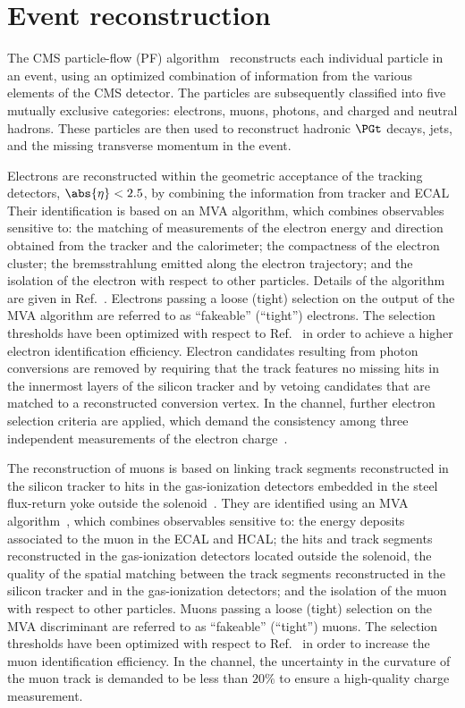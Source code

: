 \section{Event reconstruction}
\label{sec:eventReconstruction}

The CMS particle-flow (PF) algorithm~\cite{Sirunyan:2017ulk} reconstructs each individual particle in an event,
using an optimized combination of information from the various elements of the CMS detector.
The particles are subsequently classified into five mutually exclusive categories: 
electrons, muons, photons, and charged and neutral hadrons.
These particles are then used to reconstruct hadronic $\PGt$ decays, jets, and the missing transverse momentum in the event.

Electrons are reconstructed within the geometric acceptance of the tracking detectors, $\abs{\eta} < 2.5$,
by combining the information from tracker and ECAL~\cite{Khachatryan:2015hwa}
Their identification is based on an MVA algorithm, which combines observables sensitive 
to: the matching of measurements of the electron energy and direction obtained from the tracker and the calorimeter;
the compactness of the electron cluster;
the bremsstrahlung emitted along the electron trajectory;
and the isolation of the electron with respect to other particles.
Details of the algorithm are given in Ref.~\cite{Sirunyan:2020icl}.
Electrons passing a loose (tight) selection on the output of the MVA algorithm are referred to as ``fakeable'' (``tight'') electrons.
The selection thresholds have been optimized with respect to Ref.~\cite{Sirunyan:2020icl} in order to achieve a higher electron identification efficiency.
Electron candidates resulting from photon conversions are removed by requiring 
that the track features no missing hits in the innermost layers of the silicon tracker and by vetoing candidates that are matched to a reconstructed conversion vertex.
In the \twoLeptonssZeroTau channel, further electron selection criteria are applied,
which demand the consistency among three independent measurements of the electron charge~\cite{Khachatryan:2015hwa}.

The reconstruction of muons is based on linking track segments reconstructed in the silicon tracker 
to hits in the gas-ionization detectors embedded in the steel flux-return yoke outside the solenoid~\cite{Sirunyan:2018}.
They are identified using an MVA algorithm~\cite{Sirunyan:2020icl}, which combines observables sensitive 
to: the energy deposits associated to the muon in the ECAL and HCAL;
the hits and track segments reconstructed in the gas-ionization detectors located outside the solenoid,
the quality of the spatial matching between the track segments reconstructed in the silicon tracker and in the gas-ionization detectors;
and the isolation of the muon with respect to other particles.
Muons passing a loose (tight) selection on the MVA discriminant are referred to as ``fakeable'' (``tight'') muons.
The selection thresholds have been optimized with respect to Ref.~\cite{Sirunyan:2020icl} in order to increase the muon identification efficiency.
In the \twoLeptonssZeroTau channel, the uncertainty in the curvature of the muon track is demanded to be less than $20\%$
to ensure a high-quality charge measurement.

